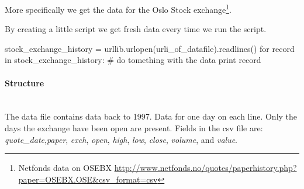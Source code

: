 More specifically we get the data for the Oslo Stock exchange\footnote{Netfonds
data on OSEBX
\url{http://www.netfonds.no/quotes/paperhistory.php?paper=OSEBX.OSE&csv_format=csv}}. 

By creating a little script we get fresh data every time we run the script.
\begin{python}
stock_exchange_history = urllib.urlopen(urli_of_datafile).readlines()
    for record in stock_exchange_history:
        # do tomething with the data
        print record
\end{python} 

\paragraph{Structure}
\hspace{0pt}\\
The data file contains data back to 1997. Data for one day on each line. Only
the days the exchange have been open are present.
Fields in the csv file are: \textit{quote\_date},\textit{paper},
\textit{exch}, \textit{open}, \textit{high}, \textit{low}, \textit{close},
\textit{volume}, and \textit{value}.
%

